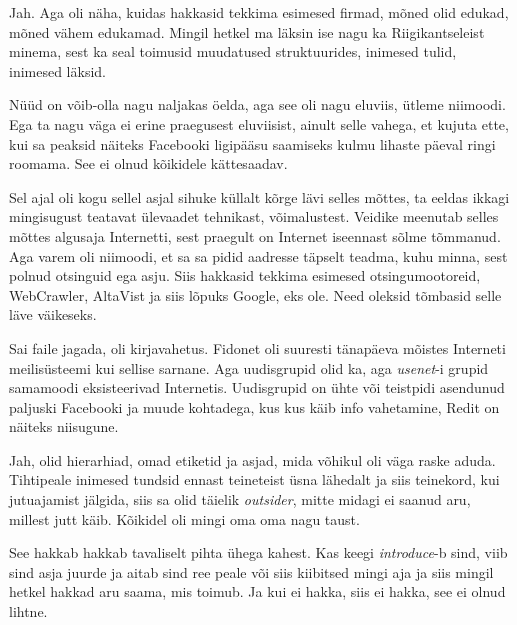 
Jah. Aga oli näha, kuidas hakkasid tekkima esimesed firmad, mõned olid edukad, mõned vähem edukamad. Mingil hetkel ma läksin ise nagu ka Riigikantseleist minema, sest ka seal toimusid muudatused struktuurides, inimesed tulid, inimesed läksid.


Nüüd on võib-olla nagu naljakas öelda, aga see oli nagu eluviis, ütleme niimoodi. Ega ta nagu väga ei erine praegusest eluviisist, ainult selle vahega, et kujuta ette, kui sa peaksid näiteks Facebooki ligipääsu saamiseks kulmu lihaste päeval ringi roomama. See ei olnud kõikidele kättesaadav. 
                 
Sel ajal oli kogu sellel asjal sihuke küllalt kõrge lävi selles mõttes, ta eeldas ikkagi mingisugust teatavat ülevaadet tehnikast, võimalustest. Veidike meenutab selles mõttes algusaja Internetti, sest praegult on Internet iseennast sõlme tõmmanud. Aga varem oli niimoodi, et sa sa pidid aadresse täpselt teadma, kuhu minna, sest polnud otsinguid ega asju. Siis hakkasid tekkima esimesed otsingumootoreid, WebCrawler, AltaVist ja siis lõpuks Google, eks ole. Need oleksid tõmbasid selle läve  väikeseks. 

                 
Sai faile jagada, oli kirjavahetus. Fidonet oli suuresti tänapäeva mõistes Interneti meilisüsteemi kui sellise sarnane. Aga uudisgrupid olid ka, aga \emph{usenet}-i grupid samamoodi eksisteerivad Internetis. Uudisgrupid on ühte või teistpidi asendunud paljuski Facebooki ja muude kohtadega, kus kus käib info vahetamine, Redit on näiteks niisugune.


Jah, olid hierarhiad, omad etiketid ja asjad, mida võhikul oli väga raske aduda. Tihtipeale inimesed tundsid ennast teineteist üsna lähedalt ja siis teinekord, kui jutuajamist jälgida, siis sa olid täielik \emph{outsider}, mitte midagi ei saanud aru, millest jutt käib. Kõikidel oli mingi oma oma nagu taust.


See hakkab hakkab tavaliselt pihta ühega kahest. Kas keegi \emph{introduce}-b sind, viib sind asja juurde ja aitab sind ree peale või siis kiibitsed mingi aja ja siis mingil hetkel hakkad aru saama, mis toimub. Ja kui ei hakka, siis ei hakka, see ei olnud lihtne.

